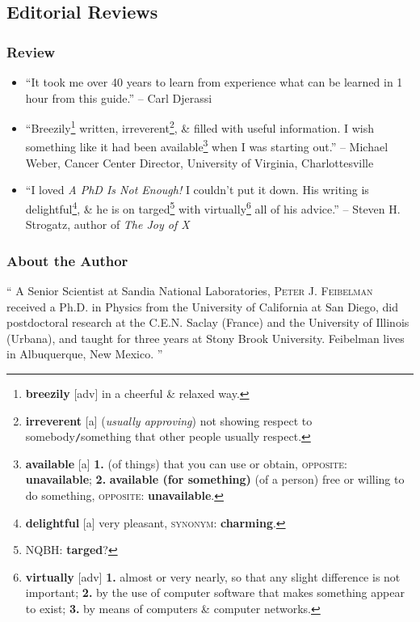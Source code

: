 \documentclass[oneside]{book}
\numberwithin{equation}{section}
\begin{document}
\subsection*{Editorial Reviews}

\subsubsection*{Review}

\begin{itemize}
	\item ``It took me over 40 years to learn from experience what can be learned in 1 hour from this guide.'' -- Carl Djerassi
	\item ``Breezily\footnote{\textbf{breezily} [adv] in a cheerful \& relaxed way.} written, irreverent\footnote{\textbf{irreverent} [a] (\textit{usually approving}) not showing respect to somebody\texttt{/}something that other people usually respect.}, \& filled with useful information. I wish something like it had been available\footnote{\textbf{available} [a] \textbf{1.} (of things) that you can use or obtain, \textsc{opposite}: \textbf{unavailable}; \textbf{2.} \textbf{available (for something)} (of a person) free or willing to do something, \textsc{opposite}: \textbf{unavailable}.} when I was starting out.'' -- Michael Weber, Cancer Center Director, University of Virginia, Charlottesville
	\item ``I loved \textit{A PhD Is Not Enough!} I couldn't put it down. His writing is delightful\footnote{\textbf{delightful} [a] very pleasant, \textsc{synonym}: \textbf{charming}.}, \& he is on targed\footnote{NQBH: \textbf{targed}?} with virtually\footnote{\textbf{virtually} [adv] \textbf{1.} almost or very nearly, so that any slight difference is not important; \textbf{2.} by the use of computer software that makes something appear to exist; \textbf{3.} by means of computers \& computer networks.} all of his advice.'' -- Steven H. Strogatz, author of \textit{The Joy of X}
\end{itemize}

\subsubsection*{About the Author}
`` A Senior Scientist at Sandia National Laboratories, \textsc{Peter J. Feibelman} received a Ph.D. in Physics from the University of California at San Diego, did postdoctoral research at the C.E.N. Saclay (France) and the University of Illinois (Urbana), and taught for three years at Stony Brook University. Feibelman lives in Albuquerque, New Mexico. ''
\end{document}
